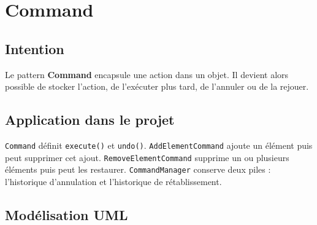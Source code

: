 \documentclass[12pt,a4paper]{article}
\begin{document}
\section{Command}

\subsection{Intention}

Le pattern \textbf{Command} encapsule une action dans un objet. Il devient alors possible de stocker l'action, de l'exécuter plus tard, de l'annuler ou de la rejouer.

\subsection{Application dans le projet}

\texttt{Command} définit \texttt{execute()} et \texttt{undo()}. \texttt{AddElementCommand} ajoute un élément puis peut supprimer cet ajout. \texttt{RemoveElementCommand} supprime un ou plusieurs éléments puis peut les restaurer. \texttt{CommandManager} conserve deux piles : l'historique d'annulation et l'historique de rétablissement.

\subsection{Modélisation UML}
\end{document}
